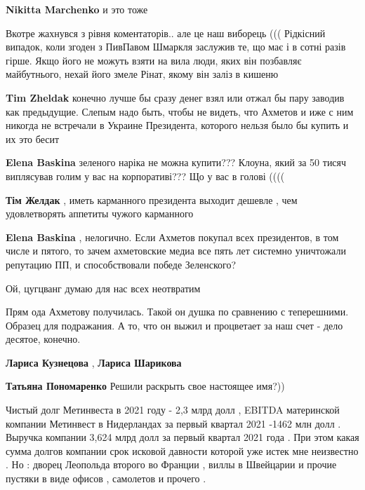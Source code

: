 \begin{itemize}
\textbf{Nikitta Marchenko} и это тоже


\obeycr
Вкотре жахнувся з рівня коментаторів.. але це наш виборець (((
Рідкісний випадок, коли згоден з ПивПавом
Шмаркля заслужив те, що має і в сотні разів гірше. Якщо його не можуть взяти на вила люди, яких він позбавляє майбутнього, нехай його змеле Рінат, якому він заліз в кишеню
\restorecr

\begin{itemize} %
\textbf{Tim Zheldak} конечно лучше бы сразу денег взял или отжал бы пару заводив как предыдущие. Слепым надо быть, чтобы не видеть, что Ахметов и иже с ним никогда не встречали в Украине Президента, которого нельзя было бы купить и их это бесит

\textbf{Elena Baskina} зеленого наріка не можна купити???
Клоуна, який за 50 тисяч виплясував голим у вас на корпоративі???
Що у вас в голові ((((

\textbf{Тім Желдак} , иметь карманного президента выходит дешевле , чем удовлетворять аппетиты чужого карманного

\textbf{Elena Baskina} , нелогично. Если Ахметов покупал всех президентов, в том числе и пятого, то зачем ахметовские медиа все пять лет системно уничтожали репутацию ПП, и способствовали победе Зеленского?
\end{itemize} %

Ой, цугцванг думаю для нас всех неотвратим


Прям ода Ахметову получилась. Такой он душка по сравнению с теперешними.
Образец для подражания. А то, что он выжил и процветает за наш счет - дело
десятое, конечно.

\begin{itemize} %
\textbf{Лариса Кузнецова} , \textbf{Лариса Шарикова}

\textbf{Татьяна Пономаренко} Решили раскрыть свое настоящее имя?))
\end{itemize} %


Чистый долг Метинвеста в 2021 году - 2,3 млрд долл , EBITDA материнской
компании Метинвест в Нидерландах за первый квартал 2021 -1462 млн долл .
Выручка компании 3,624 млрд долл за первый квартал 2021 года . При этом какая
сумма долгов компании срок исковой давности которой уже истек мне неизвестно .
Но : дворец Леопольда второго во Франции , виллы в Швейцарии и прочие пустяки в
виде офисов , самолетов и прочего .


\end{itemize}
